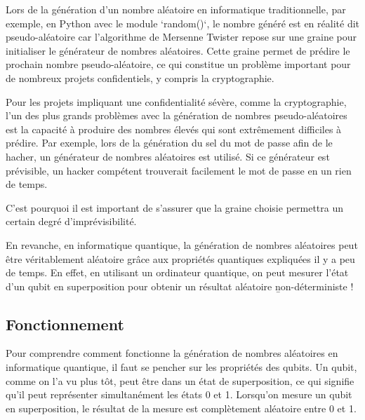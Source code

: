 \documentclass{article}
\begin{document}
Lors de la génération d'un nombre aléatoire en informatique traditionnelle, par exemple, en Python avec le module `random()`, le nombre généré est en réalité dit pseudo-aléatoire car l'algorithme de Mersenne Twister repose sur une graine pour initialiser le générateur de nombres aléatoires. Cette graine permet de prédire le prochain nombre pseudo-aléatoire, ce qui constitue un problème important pour de nombreux projets confidentiels, y compris la cryptographie.

Pour les projets impliquant une confidentialité sévère, comme la cryptographie, l'un des plus grands problèmes avec la génération de nombres pseudo-aléatoires est la capacité à produire des nombres élevés qui sont extrêmement difficiles à prédire. Par exemple, lors de la génération du sel du mot de passe afin de le hacher, un générateur de nombres aléatoires est utilisé. Si ce générateur est prévisible, un hacker compétent trouverait facilement le mot de passe en un rien de temps.

C'est pourquoi il est important de s'assurer que la graine choisie permettra un certain degré d'imprévisibilité.

En revanche, en informatique quantique, 
la génération de nombres aléatoires peut être véritablement aléatoire grâce aux propriétés 
quantiques expliquées il y a peu de temps. En effet, en utilisant un ordinateur 
quantique, on peut mesurer l'état d'un qubit en superposition pour obtenir un résultat aléatoire \b{non-déterministe} !

\subsection{Fonctionnement}

Pour comprendre comment fonctionne la génération de nombres aléatoires en informatique quantique, il faut se pencher sur les propriétés des qubits. Un qubit, comme on l'a vu plus tôt, peut être dans un état de superposition, ce qui signifie qu'il peut représenter simultanément les états 0 et 1. Lorsqu'on mesure un qubit en superposition, le résultat de la mesure est complètement aléatoire entre 0 et 1.
\end{document}

